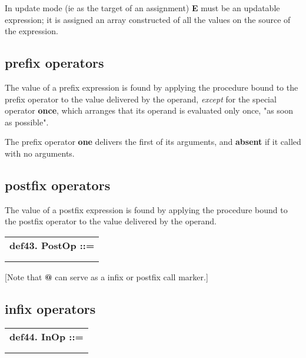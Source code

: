 \documentclass{report}
\begin{document}
In update mode (ie as the target of an assignment) {\bf E} must be an
updatable expression; it is assigned an array constructed of all the
values on the source of the expression.

\subsection{prefix operators}


The value of a prefix expression is found by applying the procedure
bound to the prefix operator to the value delivered by the operand,
{\em except} for the special operator {\bf once}, which arranges that its
operand is evaluated only once, "as soon as possible".

The prefix operator {\bf one} delivers the first of its arguments, and
{\bf absent} if it called with no arguments.

\subsection{postfix operators}


The value of a postfix expression is found by applying the procedure
bound to the postfix operator to the value delivered by the operand.

\begin{tabular}{l}
{\bf def43. PostOp ::= }\\ 
\hspace*{3mm}{\tt LexicalPostfixOperator} \\ 
\hspace*{3mm}{\tt  $\mid$ "@" DotExpr} \\ 
\end{tabular}



{[}Note that {\bf @} can serve as a infix or postfix call marker.{]}

\subsection{infix operators}


\begin{tabular}{l}
{\bf def44. InOp ::= }\\ 
\hspace*{3mm}{\tt LexicalInfixOperator} \\ 
\hspace*{3mm}{\tt  $\mid$ "@" DotExpr} \\ 
\end{tabular}
\end{document}
